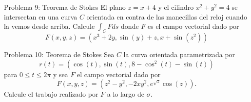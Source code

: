 \documentclass[usepdftitle=false]{beamer}
\begin{document}
\begin{frame}{Problema 9: Teorema de Stokes}
El plano $z=x+4$ y el cilindro $x^2+y^2=4$ se intersectan en una curva $C$ orientada en contra de las manecillas del reloj cuando la vemos desde arriba. Calcule $\int_CFds$ donde $F$ es el campo vectorial dado por
\[F(x,y,z) = \left(x^3+2y,\sin(y)+z,x+\sin(z^2)\right)\] 
\end{frame}

\begin{frame}{Problema 10: Teorema de Stokes}
Sea $C$ la curva orientada parametrizada por 
\[r(t)=\left(\cos(t), \sin(t), 8-\cos^2(t)-\sin (t)\right)\] para $0\leq t\leq 2\pi$ y sea $F$ el campo vectorial dado por
\[F(x,y,z)=\left(z^2-y^2, -2xy^2, e^{\sqrt{z}}\cos(z)\right).\]
Calcule el trabajo realizado por $F$ a lo largo de $\sigma$. 
 
 
\end{frame}
\end{document}
